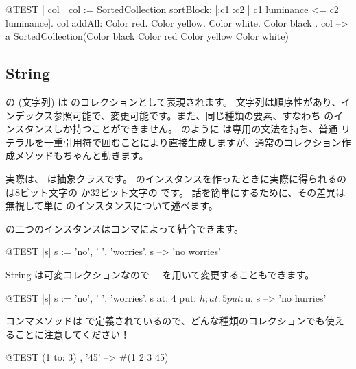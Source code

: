 \documentclass[a4paper,10pt,twoside]{book}
\begin{document}
\begin{code}{@TEST | col |}
col := SortedCollection sortBlock: [:c1 :c2 | c1 luminance <= c2 luminance].
col addAll: { Color red. Color yellow. Color white. Color black }.
col --> a SortedCollection(Color black Color red Color yellow Color white)
\end{code}

\subsection{String}
\st の (文字列) は  のコレクションとして表現されます。
文字列は順序性があり、インデックス参照可能で、変更可能です。また、同じ種類の要素、すなわち  のインスタンスしか持つことができません。
 のように は専用の文法を持ち、普通  リテラルを一重引用符で囲むことにより直接生成しますが、通常のコレクション作成メソッドもちゃんと動きます。


実際は、 は抽象クラスです。
 のインスタンスを作ったときに実際に得られるのは8ビット文字の  か32ビット文字の  です。
話を簡単にするために、その差異は無視して単に  のインスタンスについて述べます。

 の二つのインスタンスはコンマによって結合できます。
\begin{code}{@TEST |s|}
s := 'no', ' ', 'worries'.
s -->  'no worries'
\end{code}

String は可変コレクションなので　 を用いて変更することもできます。

\begin{code}{@TEST |s| s := 'no', ' ', 'worries'.}
s at: 4 put: $h; at: 5 put: $u.
s --> 'no hurries'
\end{code}

コンマメソッドは  で定義されているので、どんな種類のコレクションでも使えることに注意してください！
\begin{code}{@TEST}
(1 to: 3) , '45' --> #(1 2 3 $4 $5)
\end{code}
\end{document}
